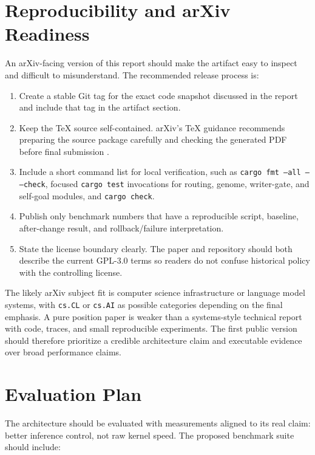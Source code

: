 \documentclass[10pt]{article}
\begin{document}
\section{Reproducibility and arXiv Readiness}

An arXiv-facing version of this report should make the artifact easy to inspect
and difficult to misunderstand. The recommended release process is:

\begin{enumerate}[leftmargin=*]
  \item Create a stable Git tag for the exact code snapshot discussed in the
  report and include that tag in the artifact section.
  \item Keep the TeX source self-contained. arXiv's TeX guidance recommends
  preparing the source package carefully and checking the generated PDF before
  final submission \cite{arxivtex}.
  \item Include a short command list for local verification, such as
  \texttt{cargo fmt --all -- --check}, focused \texttt{cargo test} invocations
  for routing, genome, writer-gate, and self-goal modules, and
  \texttt{cargo check}.
  \item Publish only benchmark numbers that have a reproducible script,
  baseline, after-change result, and rollback/failure interpretation.
  \item State the license boundary clearly. The paper and repository should
  both describe the current GPL-3.0 terms so readers do not confuse historical
  policy with the controlling license.
\end{enumerate}

The likely arXiv subject fit is computer science infrastructure or language
model systems, with \texttt{cs.CL} or \texttt{cs.AI} as possible categories
depending on the final emphasis. A pure position paper is weaker than a
systems-style technical report with code, traces, and small reproducible
experiments. The first public version should therefore prioritize a credible
architecture claim and executable evidence over broad performance claims.

\section{Evaluation Plan}

The architecture should be evaluated with measurements aligned to its real
claim: better inference control, not raw kernel speed. The proposed benchmark
suite should include:
\end{document}
